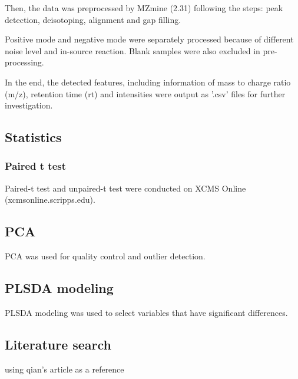 Then, the data was preprocessed by MZmine (2.31) following the steps: peak detection, deisotoping, alignment and gap filling.

Positive mode and negative mode were separately processed because of different noise level and in-source reaction. Blank samples were also excluded in pre-processing.

In the end, the detected features, including information of mass to charge ratio (m/z), retention time (rt) and intensities were output as '.csv' files for further investigation.


\subsection{Statistics}
\subsubsection{Paired t test}
Paired-t test and unpaired-t test were conducted on XCMS Online (xcmsonline.scripps.edu).

\subsection{PCA}
PCA was used for quality control and outlier detection.

\subsection{PLSDA modeling}
PLSDA modeling was used to select variables that have significant differences. 

\subsection{Literature search}
using qian's article as a reference
